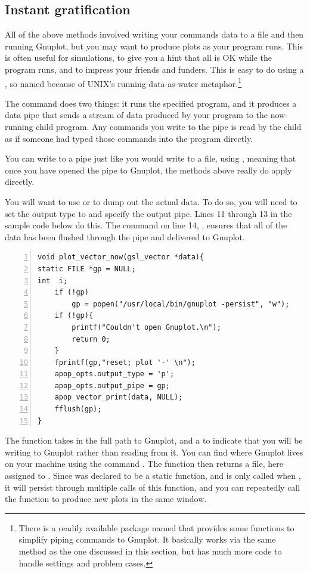 \subsection{\treesymbol Instant gratification} 
All of the above methods involved writing your commands data to a file and then 
running Gnuplot, but you may want to produce plots as your program runs.
This is often useful for simulations, to give you a hint that all is OK
while the program runs, and to impress your friends and funders. This is
easy to do using a , so named because of UNIX's running
data-as-water metaphor.\footnote{There is a readily available
package named  that provides some functions to simplify
piping commands to Gnuplot. It basically works via the same method as
the one discussed in this section, but has much more code to handle
settings and problem cases.}

The command  does two things: it runs the specified program,
and it produces a data pipe that sends a stream of data produced by your
program to the now-running child program. Any commands you write to the
pipe is read by the child as if someone had typed those commands into
the program directly.

You can write to a pipe just like you would write to a file, using
, meaning that once you have opened the pipe to
Gnuplot, the methods above really do apply directly.

You will want to use  or
 to dump out the actual data. To do so, you
will need to set the output type to  and specify the output
pipe. Lines 11 through 13 in the sample code below do this.
The command on line 14, , ensures that all of the data has
been flushed through the pipe and delivered to Gnuplot.

\label{pipeexample}
\begin{lstlisting}[numbers=left, numberstyle=\scshape]
void plot_vector_now(gsl_vector *data){
static FILE *gp = NULL;
int  i;
    if (!gp)
        gp = popen("/usr/local/bin/gnuplot -persist", "w");
    if (!gp){
        printf("Couldn't open Gnuplot.\n");
        return 0;
    }
    fprintf(gp,"reset; plot '-' \n");
    apop_opts.output_type = 'p';
    apop_opts.output_pipe = gp;
    apop_vector_print(data, NULL);
    fflush(gp);
}
\end{lstlisting} 

The  function takes in the full path to Gnuplot, and a 
to indicate that you will be writing to Gnuplot rather than reading from
it. You can find where Gnuplot lives on your machine using the command
. The  function then returns a file, here
assigned to . Since  was declared to be a static function,
and  is only called when ,
it will persist through multiple calls of this function, and you can
repeatedly call the function to produce new plots in the same window.

